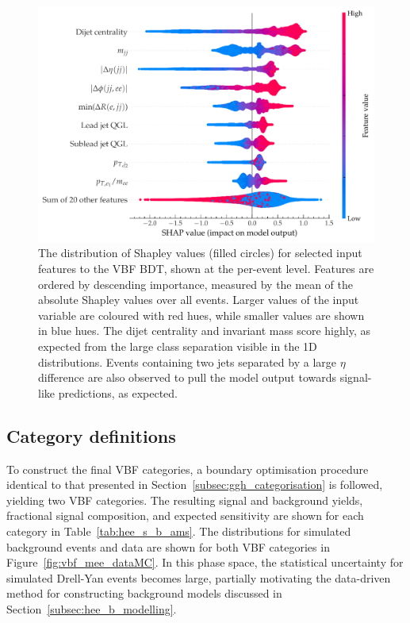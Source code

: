 \begin{figure}[htbp!] 
\centering 
\includegraphics[width =0.8\linewidth]{Figures/Hee/VBF/featureImportances/shapley_beeswarm_VBF_BDT_featureSelection.pdf}
\caption[The feature importance for selected inputs to the VBF BDT.]{The distribution of Shapley values (filled circles) for selected input features to the VBF BDT, shown at the per-event level. Features are ordered by descending importance, measured by the mean of the absolute Shapley values over all events. Larger values of the input variable are coloured with red hues, while smaller values are shown in blue hues. The dijet centrality and invariant mass score highly, as expected from the large class separation visible in the 1D distributions. Events containing two jets separated by a large $\eta$ difference are also observed to pull the model output towards signal-like predictions, as expected.}
\label{fig:vbf_mee_and_njet_evo}
\end{figure}

\subsection{Category definitions}

To construct the final VBF categories, a boundary optimisation procedure identical to that presented in Section~\ref{subsec:ggh_categorisation} is followed, yielding two VBF categories. The resulting signal and background yields, fractional signal composition, and expected sensitivity are shown for each category in Table~\ref{tab:hee_s_b_ams}. The \mee distributions for simulated background events and data are shown for both VBF categories in Figure~\ref{fig:vbf_mee_dataMC}. In this phase space, the statistical uncertainty for simulated Drell-Yan events becomes large, partially motivating the data-driven method for constructing background models discussed in Section~\ref{subsec:hee_b_modelling}.

